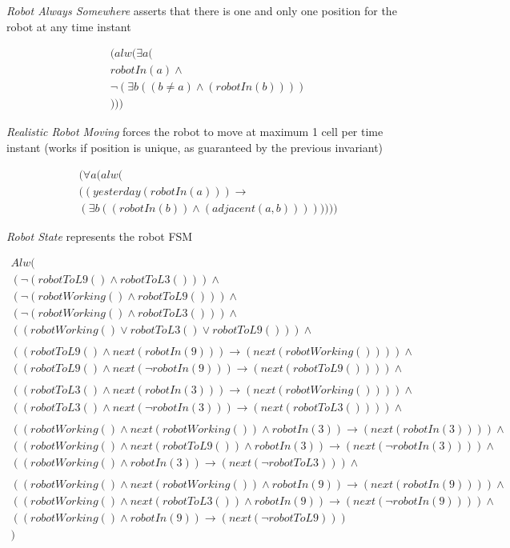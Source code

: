 \textit{Robot Always Somewhere} asserts that there is one and only one position for the robot at any time instant

\nopagebreak
\begin{align*}
	(alw(\exists a (\\
	robotIn(a)\land\\
	\neg(\exists b ((b\neq a)\land(robotIn(b))))\\
	)))
\end{align*}


\textit{Realistic Robot Moving} forces the robot to move at maximum 1 cell per time instant (works if position is unique, as guaranteed by the previous invariant)

\nopagebreak
\begin{align*}
	(\forall a (alw(\\
	((yesterday(robotIn(a)))\longrightarrow\\
	(\exists b ((robotIn(b))\land(adjacent(a,b)))) )
	)))
\end{align*}


\textit{Robot State} represents the robot FSM

\nopagebreak
\begin{align*}
	Alw(\\
	(\neg(robotToL9()\land robotToL3())) \land\\
	(\neg(robotWorking()\land robotToL9())) \land\\
	(\neg(robotWorking()\land robotToL3())) \land\\
	((robotWorking()\lor robotToL3()\lor robotToL9())) \land\\
	\\
	((robotToL9()\land next(robotIn(9)))\longrightarrow(next(robotWorking())))\land\\
	((robotToL9()\land next(\neg robotIn(9)))\longrightarrow(next(robotToL9())))\land\\
	\\
	((robotToL3()\land next(robotIn(3)))\longrightarrow(next(robotWorking())))\land\\
	((robotToL3()\land next(\neg robotIn(3)))\longrightarrow(next(robotToL3())))\land\\
	\\
	((robotWorking()\land next(robotWorking())\land robotIn(3))\longrightarrow(next(robotIn(3))))\land\\
	((robotWorking()\land next(robotToL9())\land robotIn(3))\longrightarrow(next(\neg robotIn(3))))\land\\
	((robotWorking()\land robotIn(3))\longrightarrow(next(\neg robotToL3)))\land\\
	\\
	((robotWorking()\land next(robotWorking())\land robotIn(9))\longrightarrow(next(robotIn(9))))\land\\
	((robotWorking()\land next(robotToL3())\land robotIn(9))\longrightarrow(next(\neg robotIn(9))))\land\\
	((robotWorking()\land robotIn(9))\longrightarrow(next(\neg robotToL9)))\\
)
\end{align*}
\newpage

